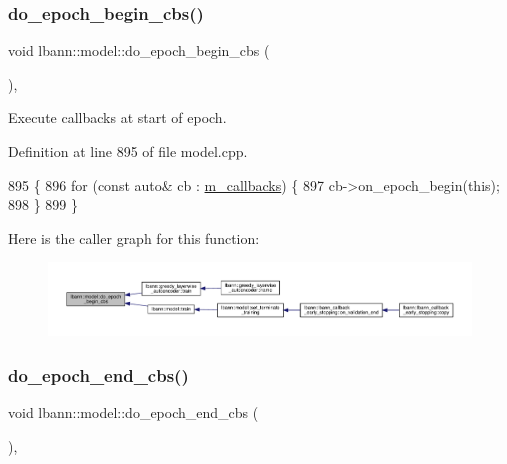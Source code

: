 \mbox{\label{classlbann_1_1model_a6f975af3ff4921d78a9eb1aca12eaf5e}} 
\subsubsection{\texorpdfstring{do\+\_\+epoch\+\_\+begin\+\_\+cbs()}{do\_epoch\_begin\_cbs()}}
{\footnotesize\ttfamily void lbann\+::model\+::do\+\_\+epoch\+\_\+begin\+\_\+cbs (\begin{DoxyParamCaption}{ }\end{DoxyParamCaption})\hspace{0.3cm}{\ttfamily [protected]}, {\ttfamily [virtual]}}

Execute callbacks at start of epoch. 

Definition at line 895 of file model.\+cpp.


\begin{DoxyCode}
895                                \{
896   \textcolor{keywordflow}{for} (\textcolor{keyword}{const} \textcolor{keyword}{auto}& cb : \hyperlink{classlbann_1_1model_a07b511fef30368494c2ad80922ffd0eb}{m\_callbacks}) \{
897     cb->on\_epoch\_begin(\textcolor{keyword}{this});
898   \}
899 \}
\end{DoxyCode}
Here is the caller graph for this function\+:\nopagebreak
\begin{figure}[H]
\begin{center}
\leavevmode
\includegraphics[width=350pt]{classlbann_1_1model_a6f975af3ff4921d78a9eb1aca12eaf5e_icgraph}
\end{center}
\end{figure}
\mbox{\label{classlbann_1_1model_a93e43a6c5aaf8ad890ef50ff97dfa176}} 
\subsubsection{\texorpdfstring{do\+\_\+epoch\+\_\+end\+\_\+cbs()}{do\_epoch\_end\_cbs()}}
{\footnotesize\ttfamily void lbann\+::model\+::do\+\_\+epoch\+\_\+end\+\_\+cbs (\begin{DoxyParamCaption}{ }\end{DoxyParamCaption})\hspace{0.3cm}{\ttfamily [protected]}, {\ttfamily [virtual]}}

